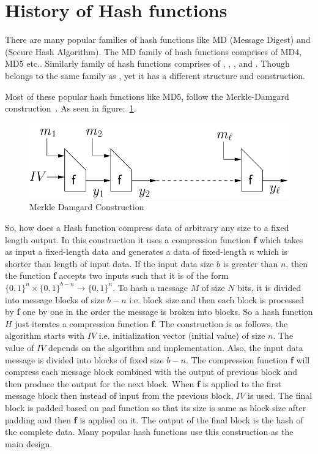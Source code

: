 \section{History of Hash functions}

There are many popular families of hash functions like MD (Message Digest) and \SHA(Secure Hash Algorithm). The MD family of hash functions comprises of MD4, MD5 etc.. Similarly \SHA{} family of hash functions comprises of , , , and .
Though  belongs to the same family as , yet it has a different structure and construction.

Most of these popular hash functions like MD5,  follow the Merkle-Damgard construction~\cite{merkle}. As seen in figure:~\ref{MDConstruction}.

\begin{figure}
    \centering
    \includegraphics[scale=0.5]{MDConstruction.png}
    \caption{Merkle Damgard Construction~\cite{MDamgard}}
    \label{MDConstruction}
\end{figure}

So, how does a Hash function compress data of arbitrary any size to a fixed length output. In this construction it uses a compression function \textbf{f} which takes as input a fixed-length data and generates a data of fixed-length $n$ which is shorter than length of input data. If the input data size $b$ is greater than $n$, then the function \textbf{f} accepts two inputs such that it is of the form $\big\{0,1\big\}^n \times \big\{0,1\big\}^{b - n} \rightarrow \big\{0,1\big\}^n$. To hash a message $M$ of size $N$ bits, it is divided into message blocks of size $b-n$ i.e. block size and then each block is processed by \textbf{f} one by one in the order the message is broken into blocks. So a hash function $H$ just iterates a compression function \textbf{f}. The construction is as follows, the algorithm starts with $IV$ i.e. initialization vector (initial value) of size $n$. The value of $IV$ depends on the algorithm and implementation. Also, the input data message is divided into blocks of fixed size $b-n$.
The compression function \textbf{f} will compress each message block combined with the output of previous block and then produce the output for the next block. When \textbf{f} is applied to the first message block then instead of input from the previous block, $IV$ is used. The final block is padded based on pad function so that its size is same as block size after padding and then \textbf{f} is applied on it. The output of the final block is the hash of the complete data. Many popular hash functions use this construction as the main design. 

